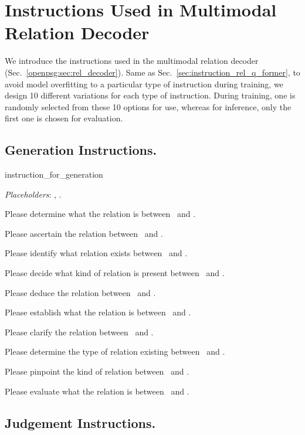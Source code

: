 \section{Instructions Used in Multimodal Relation Decoder}
\label{sec:instruction_rel_decoder}
We introduce the instructions used in the multimodal relation decoder (Sec.~\ref{openpsg:sec:rel_decoder}).
Same as Sec.~\ref{sec:instruction_rel_q_former}, to avoid model overfitting to a particular type of instruction during training, we design 10 different variations for each type of instruction.
During training, one is randomly selected from these 10 options for use, whereas for inference, only the first one is chosen for evaluation.

\subsection{Generation Instructions.}

\begin{instructionbox}{instruction\_for\_generation}
\small
\raggedright
\noindent \textit{Placeholders}: \instsubject, \instobject.
\begin{instructionitems}
\item Please determine what the relation is between \instsubject\ and \instobject.
\item Please ascertain the relation between \instsubject\ and \instobject.
\item Please identify what relation exists between \instsubject\ and \instobject.
\item Please decide what kind of relation is present between \instsubject\ and \instobject.
\item Please deduce the relation between \instsubject\ and \instobject.
\item Please establish what the relation is between \instsubject\ and \instobject.
\item Please clarify the relation between \instsubject\ and \instobject.
\item Please determine the type of relation existing between \instsubject\ and \instobject.
\item Please pinpoint the kind of relation between \instsubject\ and \instobject.
\item Please evaluate what the relation is between \instsubject\ and \instobject.
\end{instructionitems}
\end{instructionbox}

\subsection{Judgement Instructions.}

